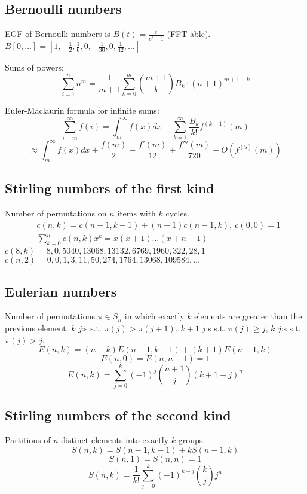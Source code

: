   \subsection{Bernoulli numbers}
    EGF of Bernoulli numbers is $B(t)=\frac{t}{e^t-1}$ (FFT-able).
    $B[0,\ldots] = [1, -\frac{1}{2}, \frac{1}{6}, 0, -\frac{1}{30}, 0, \frac{1}{42}, \ldots]$

    Sums of powers:
    \small
    \[ \sum_{i=1}^n n^m = \frac{1}{m+1} \sum_{k=0}^m \binom{m+1}{k} B_k \cdot (n+1)^{m+1-k} \]
    \normalsize

    Euler-Maclaurin formula for infinite sums:
    \small
    \[ \sum_{i=m}^{\infty} f(i) = \int_m^\infty f(x) dx - \sum_{k=1}^\infty \frac{B_k}{k!}f^{(k-1)}(m) \]
    \[ \approx \int_{m}^\infty f(x)dx + \frac{f(m)}{2} - \frac{f'(m)}{12} + \frac{f'''(m)}{720} + O(f^{(5)}(m)) \]
    \normalsize

  \subsection{Stirling numbers of the first kind}
    Number of permutations on $n$ items with $k$ cycles.
    \begin{align*}
      &c(n,k) = c(n-1,k-1) + (n-1) c(n-1,k),\ c(0,0) = 1 \\
      &\textstyle \sum_{k=0}^n c(n,k)x^k = x(x+1) \dots (x+n-1)
    \end{align*}
    $c(8,k) = 8, 0, 5040, 13068, 13132, 6769, 1960, 322, 28, 1$ \\
    $c(n,2) = 0, 0, 1, 3, 11, 50, 274, 1764, 13068, 109584, \dots$

  \subsection{Eulerian numbers}
    Number of permutations $\pi \in S_n$ in which exactly $k$ elements are greater than the previous element. $k$ $j$:s s.t. $\pi(j)>\pi(j+1)$, $k+1$ $j$:s s.t. $\pi(j)\geq j$, $k$ $j$:s s.t. $\pi(j)>j$.
    $$E(n,k) = (n-k)E(n-1,k-1) + (k+1)E(n-1,k)$$
    $$E(n,0) = E(n,n-1) = 1$$
    $$E(n,k) = \sum_{j=0}^k(-1)^j\binom{n+1}{j}(k+1-j)^n$$

  \subsection{Stirling numbers of the second kind}
    Partitions of $n$ distinct elements into exactly $k$ groups.
    $$S(n,k) = S(n-1,k-1) + k S(n-1,k)$$
    $$S(n,1) = S(n,n) = 1$$
    $$S(n,k) = \frac{1}{k!}\sum_{j=0}^k (-1)^{k-j}\binom{k}{j}j^n$$

